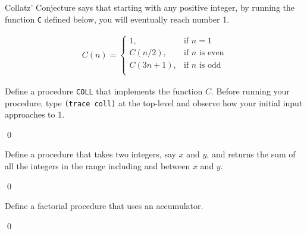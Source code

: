 \documentclass[a4paper,11pt]{article}
\begin{document}
\begin{uexercise}

Collatz' Conjecture says that starting with any positive integer, by running the function \Verb+C+ defined below, you will eventually reach number 1.

\begin{align}
C(n) =  
\begin{cases}
1, & \text{if } n = 1 \\
C(n/2), & \text{if }n\text{ is even}\\ 
C(3n+1), & \text{if }n\text{ is odd}\\ 
\end{cases}
\end{align}

Define a procedure \Verb+COLL+ that implements the function $C$. Before running your procedure, type \Verb+(trace coll)+ at the top-level and observe how your initial input approaches to 1. 

\qed
\end{uexercise}


\begin{uexercise}
Define a procedure that takes two integers, say $x$ and $y$, and returns the sum of all the integers in the range including and between $x$ and $y$. 

\qed
\end{uexercise}

\begin{uexercise}

Define a factorial procedure that uses an accumulator.

\qed
\end{uexercise}

% 
\end{document}
